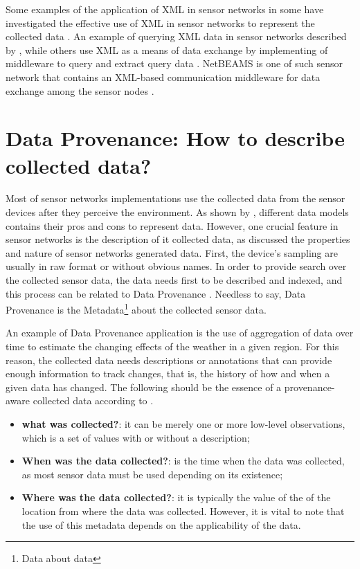 Some examples of the application of XML in sensor networks in
\cite{sn-xml-usage02} some have investigated the effective use of XML in
sensor networks to represent the collected data \cite{sn-xml-usage01}. An
example of querying XML data in sensor networks described by
\cite{sn-xml-query-engines}, while others use XML as a means of data exchange
by implementing of middleware to query and extract query data
\cite{sn-xml-middleware}. NetBEAMS is one of such sensor network that contains
an XML-based communication middleware for data exchange among the sensor nodes
\cite{netbeams2009}.

\section{Data Provenance: How to describe collected data?}
\label{sec:sn-provenance}

Most of sensor networks implementations use the collected data from the sensor
devices after they perceive the environment. As shown by
\cite{sn-data-model-survey}, different data models contains their pros and
cons to represent data. However, one crucial feature in sensor networks is the
description of it collected data, as \cite{sn-provenance} discussed the
properties and nature of sensor networks generated data. First, the device's
sampling are usually in raw format or without obvious names. In order to
provide search over the collected sensor data, the data needs first to be
described and indexed, and this process can be related to Data Provenance
\cite{db-provenance}. Needless to say, Data Provenance is the
Metadata\footnote{Data about data} about the collected sensor data.

An example of Data Provenance application is the use of aggregation of data
over time to estimate the changing effects of the weather in a given region.
For this reason, the collected data needs descriptions or annotations that can
provide enough information to track changes, that is, the history of how and
when a given data has changed. The following should be the essence of a
provenance-aware collected data according to \cite{sn-provenance}.

\begin{itemize}
  \item \textbf{what was collected?}: it can be merely one or more low-level
  observations,  which is a set of values with or without a description;
  \item \textbf{When was the data collected?}: is the time when the data was
  collected,  as most sensor data must be used depending on its existence;
  \item \textbf{Where was the data collected?}: it is typically the value of 
  the of the location from where the data was collected. However, it is vital to
  note that the use of this metadata depends on the applicability of the data.
\end{itemize}

